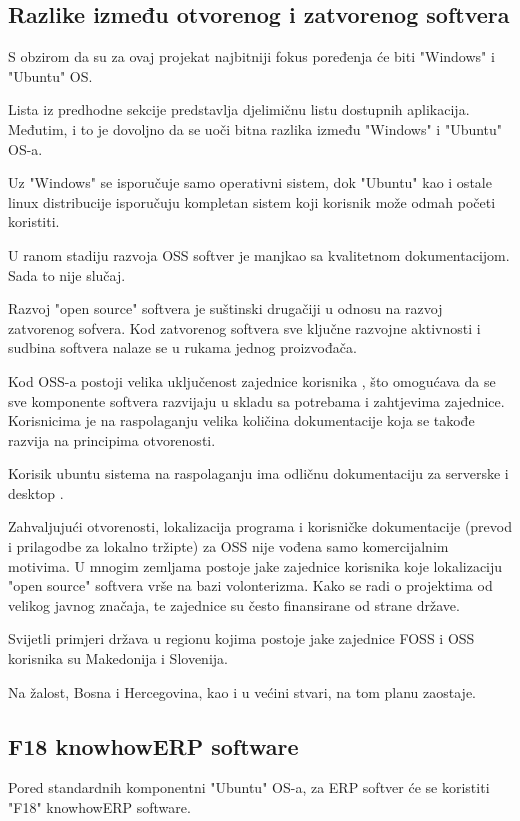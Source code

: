 \documentclass[times, utf8, seminar]{fit}
\begin{document}
 
\subsection{Razlike između otvorenog i zatvorenog softvera} 

S obzirom da su za ovaj projekat najbitniji fokus poređenja će biti "Windows" i "Ubuntu" OS. 

Lista iz predhodne sekcije predstavlja djelimičnu listu dostupnih aplikacija. Međutim, i to je dovoljno da se uoči bitna razlika između "Windows" i "Ubuntu" OS-a. 

Uz "Windows" se isporučuje samo operativni sistem, dok "Ubuntu" kao i ostale linux distribucije isporučuju kompletan sistem koji korisnik može odmah početi koristiti.

U ranom stadiju razvoja OSS softver je manjkao sa kvalitetnom dokumentacijom. Sada to nije slučaj. 

Razvoj "open source" softvera je suštinski drugačiji u odnosu na razvoj zatvorenog sofvera. Kod zatvorenog softvera sve ključne razvojne aktivnosti i sudbina softvera nalaze se u rukama jednog proizvođača.

Kod OSS-a postoji velika uključenost zajednice korisnika , što omogućava da se sve komponente softvera razvijaju u skladu sa potrebama i zahtjevima zajednice. Korisnicima je na raspolaganju velika količina dokumentacije koja se takođe razvija na principima otvorenosti.

Korisik ubuntu sistema na raspolaganju ima odličnu dokumentaciju za serverske \cite{ubuntudesktop} i desktop \cite{ubuntuserver}.

Zahvaljujući otvorenosti, lokalizacija programa i korisničke dokumentacije (prevod i prilagodbe za lokalno tržipte) za OSS nije vođena samo komercijalnim motivima. U mnogim zemljama postoje jake zajednice korisnika koje lokalizaciju "open source" softvera vrše na bazi volonterizma. Kako se radi o projektima od velikog javnog značaja, te zajednice su često finansirane od strane države.

Svijetli primjeri država u regionu kojima postoje jake zajednice FOSS  i OSS  korisnika su Makedonija i Slovenija.

Na žalost, Bosna i Hercegovina, kao i u većini stvari, na tom planu zaostaje. 

\subsection{F18 knowhowERP software}
Pored standardnih komponentni "Ubuntu" OS-a, za ERP softver će se koristiti "F18" knowhowERP software.
\end{document}

